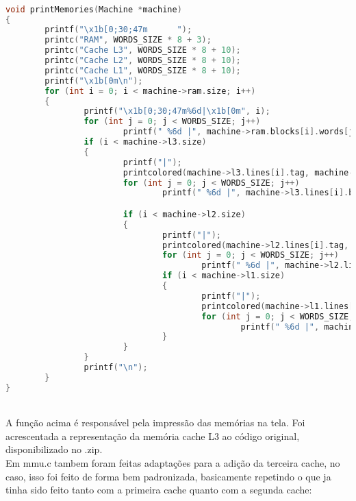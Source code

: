 \documentclass{article}
\begin{document}
\begin{lstlisting}[caption={Exemplo do código printMemories.},label={lst:cod1},language=C]

void printMemories(Machine *machine)
{
        printf("\x1b[0;30;47m      ");
        printc("RAM", WORDS_SIZE * 8 + 3);
        printc("Cache L3", WORDS_SIZE * 8 + 10);
        printc("Cache L2", WORDS_SIZE * 8 + 10);
        printc("Cache L1", WORDS_SIZE * 8 + 10);
        printf("\x1b[0m\n");
        for (int i = 0; i < machine->ram.size; i++)
        {
                printf("\x1b[0;30;47m%6d|\x1b[0m", i);
                for (int j = 0; j < WORDS_SIZE; j++)
                        printf(" %6d |", machine->ram.blocks[i].words[j]);
                if (i < machine->l3.size)
                {
                        printf("|");
                        printcolored(machine->l3.lines[i].tag, machine->l3.lines[i].updated);
                        for (int j = 0; j < WORDS_SIZE; j++)
                                printf(" %6d |", machine->l3.lines[i].block.words[j]);

                        if (i < machine->l2.size)
                        {
                                printf("|");
                                printcolored(machine->l2.lines[i].tag, machine->l2.lines[i].updated);
                                for (int j = 0; j < WORDS_SIZE; j++)
                                        printf(" %6d |", machine->l2.lines[i].block.words[j]);
                                if (i < machine->l1.size)
                                {
                                        printf("|");
                                        printcolored(machine->l1.lines[i].tag, machine->l1.lines[i].updated);
                                        for (int j = 0; j < WORDS_SIZE; j++)
                                                printf(" %6d |", machine->l1.lines[i].block.words[j]);
                                }
                        }
                }
                printf("\n");
        }
}    
\end{lstlisting}
\\ A função acima é responsável pela impressão das memórias na tela. Foi acrescentada a representação da memória cache L3 ao código original, disponibilizado no .zip.
\\Em mmu.c tambem foram feitas adaptações para a adição da terceira cache, no caso, isso foi feito de forma bem padronizada, basicamente repetindo o que ja tinha sido feito tanto com a primeira cache quanto com a segunda cache:
\end{document}
